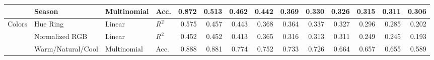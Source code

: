\begin{table}[htbp]
{\begin{tabular}{ll ll rrrrrrrrrr}
 & Season & Multinomial & Acc. & 0.872 & 0.513 & 0.462 & 0.442 & 0.369 & 0.330 & 0.326 & 0.315 & 0.311 & 0.306 \\
\midrule
\multirow{3}{*}{Colors} & Hue Ring & Linear & $R^2$ & 0.575 & 0.457 & 0.443 & 0.368 & 0.364 & 0.337 & 0.327 & 0.296 & 0.285 & 0.202 \\
 & Normalized RGB & Linear & $R^2$ & 0.452 & 0.452 & 0.413 & 0.365 & 0.316 & 0.313 & 0.311 & 0.249 & 0.245 & 0.193 \\
 & Warm/Natural/Cool & Multinomial & Acc. & 0.888 & 0.881 & 0.774 & 0.752 & 0.733 & 0.726 & 0.664 & 0.657 & 0.655 & 0.589 \\
\bottomrule
\end{tabular}}%
\end{table}

